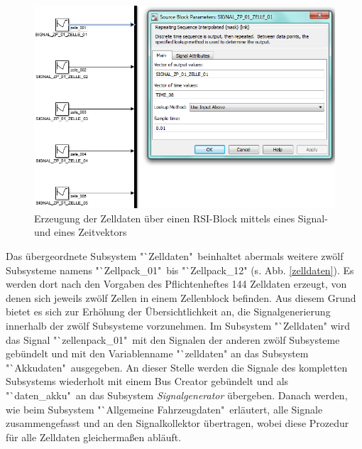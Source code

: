 \documentclass[fontsize = 12pt, paper = a4]{scrreprt}
\begin{document}
\begin{figure}[h]
\centering
\includegraphics[scale = 0.65]{makezelldaten}
\caption[Generierung der Zelldaten]{Erzeugung der Zelldaten über einen RSI-Block mittels eines Signal- und eines Zeitvektors}
\label{makezelldaten}
\end{figure}

\newpage

Das übergeordnete Subsystem "`Zelldaten"\  beinhaltet abermals weitere zwölf Subsysteme namens "`Zellpack\_01"\ bis "`Zellpack\_12" (s. Abb. \ref{zelldaten}). Es werden dort nach den Vorgaben des Pflichtenheftes 144 Zelldaten erzeugt, von denen sich jeweils zwölf Zellen in einem Zellenblock befinden. Aus diesem Grund bietet es sich zur Erhöhung der Übersichtlichkeit an, die Signalgenerierung innerhalb der zwölf Subsysteme vorzunehmen. Im Subsystem "`Zelldaten" wird das Signal "`zellenpack\_01"\ mit den Signalen der anderen zwölf Subsysteme gebündelt und mit den Variablenname "`zelldaten" an das Subsystem "`Akkudaten"\  ausgegeben. An dieser Stelle werden die Signale des kompletten Subsystems wiederholt mit einem Bus Creator gebündelt und als "`daten\_akku"\ an das Subsystem \textit{Signalgenerator} übergeben. Danach werden, wie beim Subsystem "`Allgemeine Fahrzeugdaten"\ erläutert, alle Signale zusammengefasst und an den Signalkollektor übertragen, wobei diese Prozedur für alle Zelldaten gleichermaßen abläuft. \\
\end{document}
